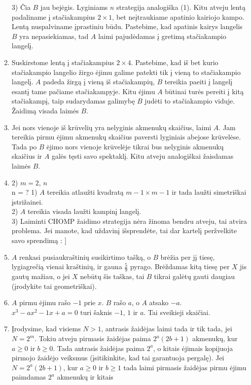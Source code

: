 \begin{enumerate}
3) Čia $B$ jau bejėgis. Lyginiams $n$ strategija analogiška (1). Kitu
atveju lentą padaliname į stačiakampius $2\times 1$, bet neįtraukiame
apatinio kairiojo kampo. Lentą nuspalviname įprastiniu būdu. Pastebime,
kad apatinis kairys langelis $B$ yra nepasiekiamas, tad $A$ laimi
pajudėdamas į gretimą stačiakampio langelį.
\item
Suskirstome lentą į stačiakampius  $2\times 4$. Pastebime, kad iš bet
kurio stačiakampio langelio žirgo ėjimu galime patekti tik į vieną to
stačiakampio langelį. $A$ padeda žirgą į vieną iš stačiakampių, $B$ tereikia
paeiti į langelį esantį tame pačiame stačiakampyje. Kitu ėjimu $A$ būtinai
turės pereiti į kitą stačiakampį, taip sudarydamas galimybę $B$ judėti to
stačiakampio viduje. Žaidimą visada laimės $B$.
\item
 Jei nors vienoje iš krūvelių yra nelyginis akmenukų skaičius, laimi $A$.
 Jam tereikia pirmu ėjimu akmenukų skaičius paversti lyginiais abejose
 krūvelėse. Tada po $B$ ėjimo nors vienoje krūvelėje tikrai bus nelyginis
 akmenukų skaičius ir $A$ galės tęsti savo spektaklį. Kitu atveju
 analogiškai žaisdamas laimės $B$. 
\item
  2) $m=2$, $n$ \\  n = ?
1) $A$ tereikia atlaužti kvadratą $ m-1\times m-1 $ ir tada laužti
simetriškai įstrižainei.\\
2) $A$ tereikia visada laužti kampinį langelį.\\
3) Laiminti CHOMP žaidimo strategija nėra žinoma bendru atveju, tai atvira
problema. Jei manote, kad uždavinį išsprendėte, tai dar kartelį
peržvelkite savo sprendimą : ] 
\item
$A$ renkasi pusiaukraštinių susikirtimo tašką, o $B$ brėžia per jį tiesę,
lygiagrečią vienai kraštinių, ir gauna $\frac{5}{9}$ pyrago. Brėždamas kitą
tiesę per $X$ jis gautų mažiau, o jei $X$ nebūtų šis taškas, tai $B$ tikrai
galėtų gauti daugiau (įrodykite tai geometriškai). 
\item
$A$ pirmu ėjimu rašo $-1$ prie $x$. $B$ rašo $a$, o $A$ atsako $-a$. $x^3-a x^2-1
x+a=0$ turi šaknis $-1$, $1$ ir $a$. Tai sveikieji skaičiai.
\item
Įrodysime, kad visiems $N>1$, antrasis žaidėjas laimi tada ir tik tada,
jei $N=2^m$. Tokiu atveju pirmasis žaidėjas paima $2^a(2b+1)$ akmenukų,
kur $a\geq 0$ ir $b\geq 0$. Tada antrasis žaidėjas paima $2^a$, o kitais
ėjimais kopijuoja pirmojo žaidėjo veiksmus (įsitikinkite, kad tai
garantuoja pergalę). Jei $N=2^a(2b+1)$, kur $a\geq 0$ ir $b\geq 1$ tada
laimi pirmasis žaidėjas pirmu ėjimu paimdamas $2^a$ akmenukų ir kitais

\end{enumerate}
